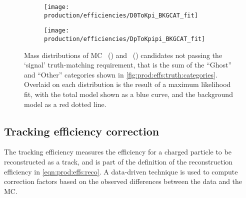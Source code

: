 \begin{figure}
  \begin{subfigure}[b]{0.5\textwidth}
    \centering
    \texttt{[image: production/efficiencies/D0ToKpi\_BKGCAT\_fit]}
    \caption{\DzToKpi}
    \label{fig:prod:effs:truth:fit:D0ToKpi}
  \end{subfigure}
  \begin{subfigure}[b]{0.5\textwidth}
    \centering
    \texttt{[image: production/efficiencies/DpToKpipi\_BKGCAT\_fit]}
    \caption{\DpToKpipi}
    \label{fig:prod:effs:truth:fit:DpToKpipi}
  \end{subfigure}
  \caption{%
    Mass distributions of \ac{MC}
    \PDzero~() and
    \PDplus~() candidates not
    passing the `signal' truth-matching requirement, that is the sum of the
    ``Ghost'' and ``Other'' categories shown in
    \cref{fig:prod:effs:truth:categories}.
    Overlaid on each distribution is the result of a maximum likelihood fit,
    with the total model shown as a blue curve, and the background model as a
    red dotted line.
  }
  \label{fig:prod:effs:truth:fit}
\end{figure}

\begin{table}
  \centering
  \caption{%
    Efficiency $1/\efftruth$ of
    the truth matching requirement applied in the simulation.
  }
  \label{tab:prod:effs:truth_matching}
  
\end{table}

\subsection{Tracking efficiency correction}
\label{chap:prod:effs:tracking}

The tracking efficiency measures the efficiency for a charged particle to be
reconstructed as a track, and is part of the definition of the reconstruction
efficiency in \cref{eqn:prod:effs:reco}.
A data-driven technique is used to compute correction factors based on the
observed differences between the data and the \ac{MC}.

